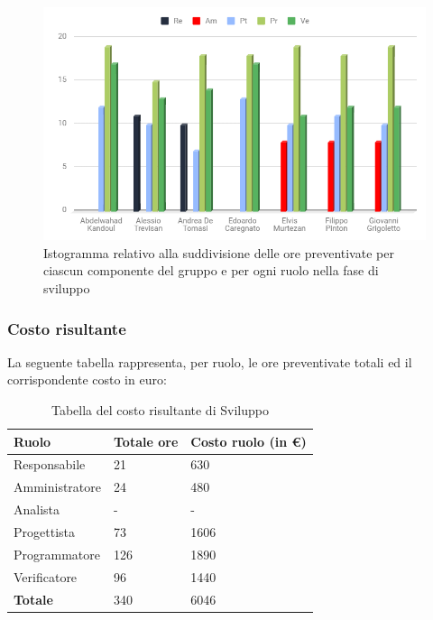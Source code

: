 \begin{figure}[h!]
	\centering
	\caption{Istogramma relativo alla suddivisione delle ore preventivate per ciascun componente del gruppo e per ogni ruolo nella fase di sviluppo}
    \includegraphics[scale=0.50]{./src/Preventivo/src/img/IstoSviluppo.png}  
\end{figure}



\subsubsection{Costo risultante}
La seguente tabella rappresenta, per ruolo, le ore preventivate totali ed il corrispondente costo in euro:
{
\renewcommand{\arraystretch}{2}
\begin{longtable}{ C{3cm} C{2cm} C{4cm}}
\caption{Tabella del costo risultante di Sviluppo}\\
\rowcolor{\primaryColor}

\textcolor{\secondaryColor}{\textbf{Ruolo}} & 
\textcolor{\secondaryColor}{\textbf{Totale ore}} & 
\textcolor{\secondaryColor}{\textbf{Costo ruolo (in \euro{})}}\\	
\endhead
        
Responsabile    & 21 & 630 \\
Amministratore  & 24 & 480 \\
Analista        & - & - \\
Progettista     & 73 & 1606 \\
Programmatore   & 126 & 1890 \\
Verificatore    & 96 & 1440 \\
\textbf{Totale} & 340 & 6046 \\
		
\end{longtable}
}


